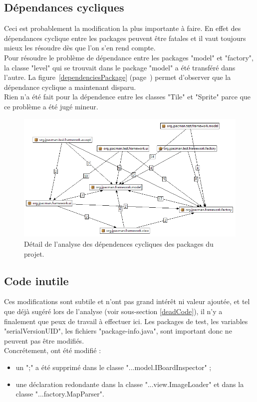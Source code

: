 \documentclass[12pt,a4paper,final]{article}
\newcommand{\labelfigure}[1]{figure~\ref{#1} (page~\pageref{#1})}
\begin{document}
\subsection{Dépendances cycliques}\label{dépendances_refact} 
Ceci est probablement la modification la plus importante à faire. En effet des dépendances cyclique entre les packages peuvent être fatales et il vaut toujours mieux les résoudre dès que l'on s'en rend compte.\\
Pour résoudre le problème de dépendance entre les packages "model" et "factory", la classe "level" qui se trouvait dans le package "model" a été transféré dans l'autre. La \labelfigure{dependenciesPackage} permet d'observer que la dépendance cyclique a maintenant disparu.\\
Rien n'a été fait pour la dépendence entre les classes "Tile" et "Sprite" parce que ce problème a été jugé mineur.
\begin{figure}[!h]
	\centering
	\includegraphics[width=\textwidth]{DependenciesPackages_refactor.png}
	\caption{\label{dependenciesPackage_refact}Détail de l'analyse des dépendences cycliques des packages du projet.}
\end{figure}

\subsection{Code inutile}\label{deadCode_refact}
Ces modifications sont subtile et n'ont pas grand intérêt ni valeur ajoutée, et tel que déjà sugéré lors de l'analyse (voir sous-section \ref{deadCode}), il n'y a finalement que peux de travail à effectuer ici.
Les packages de test, les variables "serialVersionUID", les fichiers "package-info.java",  sont important donc ne peuvent pas être modifiés.\\
Concrétement, ont été modifié : 
\begin{itemize}
\item un ";" a été supprimé dans le classe "...model.IBoardInspector" ;
\item une déclaration redondante dans la classe "...view.ImageLoader" et dans la classe "...factory.MapParser".
\end{itemize}
\end{document}
